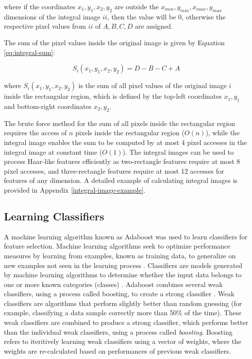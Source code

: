 where if the coordinates $x_1, y_1, x_2, y_2$ are outside the $x_{min}, y_{min}, x_{max}, y_{max}$ dimensions of the integral image $ii$, then the value will be 0, otherwise the respective pixel values from $ii$ of $A, B, C, D$ are assigned.

The sum of the pixel values inside the original image is given by Equation \ref{eq:integral-sum}:

\begin{equation} \label{eq:integral-sum}
S_i(x_1, y_1, x_2, y_2) = D - B - C + A
\end{equation}

where $S_i(x_1, y_1, x_2, y_2)$ is the sum of all pixel values of the original image $i$ inside the rectangular region, which is defined by the top-left coordinates $x_1, y_1$ and bottom-right coordinates $x_2, y_2$.

The brute force method for the sum of all pixels inside the rectangular region requires the access of $n$ pixels inside the rectangular region ($O(n)$), while the integral image enables the sum to be computed by at most 4 pixel accesses in the integral image at constant time ($O(1)$). The integral images can be used to process Haar-like features efficiently as two-rectangle features require at most 8 pixel accesses, and three-rectangle features require at most 12 accesses for features of any dimension. A detailed example of calculating integral images is provided in Appendix \ref{integral-image-example}.

\subsection{Learning Classifiers} \label{learning classifiers}

A machine learning algorithm known as Adaboost was used to learn classifiers for feature selection. Machine learning algorithms seek to optimize performance measures by learning from examples, known as training data, to generalize on new examples not seen in the learning process \cite{Domingos:2012}. Classifiers are models generated by machine learning algorithms to determine whether the input data belongs to one or more known categories (classes) \cite{Kotsiantis:2006}. Adaboost combines several weak classifiers, using a process called boosting, to create a strong classifier \cite{Freund:1997, Schapire:1999}. Weak classifiers are algorithms that perform slightly better than random guessing (for example, classifying a data sample correctly more than 50\% of the time). These weak classifiers are combined to produce a strong classifier, which performs better than the individual weak classifiers, using a process called \textit{boosting}. Boosting refers to iteritively learning weak classifiers using a vector of weights, where the weights are re-calculated based on performances of previous weak classifiers.

